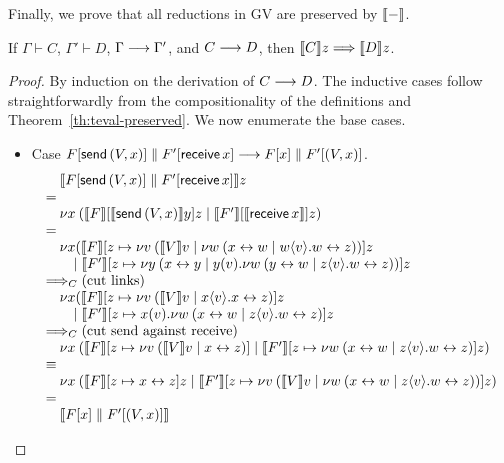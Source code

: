 \documentclass[oribibl,orivec,envcountsame]{llncs}
\begin{document}
Finally, we prove that all reductions in GV are preserved by $\llbracket - \rrbracket$.
%
\begin{theorem}
\label{th:gv-reduction-simulated}
If $\Gamma \vdash C$, $\Gamma' \vdash D$, $\Gamma \longrightarrow \Gamma'$, and $C \longrightarrow D$, then $\llbracket C \rrbracket z
\Longrightarrow \llbracket D \rrbracket z$.
\end{theorem}
\begin{proof}
By induction on the derivation of $C \longrightarrow D$. The inductive cases follow straightforwardly from
the compositionality of the definitions and Theorem~\ref{th:teval-preserved}. We now enumerate the
base cases.
\begin{itemize}
\item Case $F[\mathsf{send} \, (V,x)] \parallel F'[\mathsf{receive} \, x] \longrightarrow F[x]
  \parallel F'[(V,x)]$.
%
\[
\bl
\quad \tocp{\Fx[\gvconst{send} \app (V,x)] \parallel \Fx'[\gvconst{receive} \app x]}z \\
= \\
\quad \cut{x}{}
        {\tocp{\Fx}[\tocp{\gvconst{send} \app (V,x)}y]z}
        {\tocp{\Fx'}[\tocp{\gvconst{receive} \app x}]z} \\
= \\
\quad
  \nu x(
    {\tocp{\Fx}
      [z \mapsto \cut{v}{}{\tocp{V}v}
        {\cut{w}{}{\link{x}{w}}{w\sd{v}.\link{w}{z}}}]z} \\
\qquad \mid
    {\tocp{\Fx'}
       [z \mapsto \cut{y}{}
          {\link{x}{y}}
          {y(v).\cut{w}{}{\link{y}{w}}{z\sd{v}.\link{w}{z}}}]z} \\
\bigcrto (\text{cut links}) \\
\quad
  \nu x(
    {\tocp{\Fx}
       [z \mapsto \cut{v}{}{\tocp{V}v}
         {x\sd{v}.\link x z}]z} \\
\qquad \mid
    {\tocp{\Fx'}
       [z \mapsto x(v).\cut{w}{}{\link{x}{w}}{z\sd{v}.\link{w}{z}}]z} \\
\bigcrto (\text{cut send against receive}) \\
\quad
  \cut{x}{}
    {\tocp{\Fx}
       [z \mapsto
         \cut{v}{}{\tocp{V}v}{\link x z}]}
    {\tocp{\Fx'}
       [z \mapsto \cut{w}{}{\link{x}{w}}{z\sd{v}.\link{w}{z}}]z} \\
\equiv \\
\quad
  \cut{x}{}
    {\tocp{\Fx}[z \mapsto \link x z]z}
    {\tocp{\Fx'}[z \mapsto
      \cut{v}{}{\tocp{V}v}
        {\cut{w}{}{\link{x}{w}}
          {z\sd{v}.\link{w}{z}}}]z} \\
= \\
\quad \tocp{\Fx[x] \parallel \Fx'[(V,x)]} \\
\el
\]


\end{itemize}
\end{proof}
\end{document}
